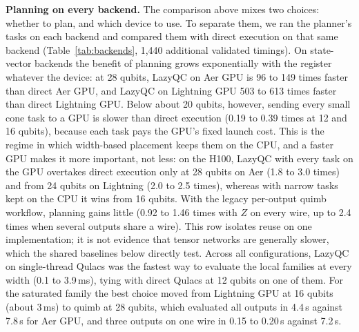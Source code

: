 \begin{table}[!t]
\caption{Same-Backend Comparison with $Z$ on Every Wire: Direct Execution Time Divided by the Time of LazyQC Running Its Tasks on the Same Backend, by Number of Qubits. Values Above One Favour LazyQC. Qulacs Uses One Thread; LazyQC on quimb Uses the Grouped Cone Plan. The quimb Row Is the Legacy Per-Output Comparator; Stronger Shared Tensor-Network Baselines Appear Below.}
\label{tab:backends}
\centering
\setlength{\tabcolsep}{3pt}
\footnotesize

\end{table}

\textbf{Planning on every backend.} The comparison above mixes two choices: whether to plan, and which device to use. To separate them, we ran the planner's tasks on each backend and compared them with direct execution on that same backend (Table~\ref{tab:backends}, 1,440 additional validated timings). On state-vector backends the benefit of planning grows exponentially with the register whatever the device: at 28 qubits, LazyQC on Aer GPU is 96 to 149 times faster than direct Aer GPU, and LazyQC on Lightning GPU 503 to 613 times faster than direct Lightning GPU. Below about 20 qubits, however, sending every small cone task to a GPU is slower than direct execution (0.19 to 0.39 times at 12 and 16 qubits), because each task pays the GPU's fixed launch cost. This is the regime in which width-based placement keeps them on the CPU, and a faster GPU makes it more important, not less: on the H100, LazyQC with every task on the GPU overtakes direct execution only at 28 qubits on Aer (1.8 to 3.0 times) and from 24 qubits on Lightning (2.0 to 2.5 times), whereas with narrow tasks kept on the CPU it wins from 16 qubits. With the legacy per-output quimb workflow, planning gains little (0.92 to 1.46 times with $Z$ on every wire, up to 2.4 times when several outputs share a wire). This row isolates reuse on one implementation; it is not evidence that tensor networks are generally slower, which the shared baselines below directly test. Across all configurations, LazyQC on single-thread Qulacs was the fastest way to evaluate the local families at every width (0.1 to 3.9\,ms), tying with direct Qulacs at 12 qubits on one of them. For the saturated family the best choice moved from Lightning GPU at 16 qubits (about 3\,ms) to quimb at 28 qubits, which evaluated all outputs in 4.4\,s against 7.8\,s for Aer GPU, and three outputs on one wire in 0.15 to 0.20\,s against 7.2\,s.

\begin{table}[!t]
\caption{Total Batch Time in Milliseconds Beyond Device Memory, Geometric Means over Two Held-Out Seeds. For LazyQC, Width Is the Range of Reduced-Circuit Widths, Not the Logical Register Width $n$ Shown in the Column Headings. Exact MPS Includes Preparation with \texttt{cutoff}${}=0$ and Every Output; $\chi$ Is Its Maximum Bond Dimension. The Saturated Family Has No LazyQC Row Because the Planner Refuses It. Exact MPS Runs Have Three Repetitions and LazyQC Runs Five.}
\label{tab:memory-wall}
\centering
\setlength{\tabcolsep}{3pt}
\footnotesize
\resizebox{\textwidth}{!}{}
\end{table}

